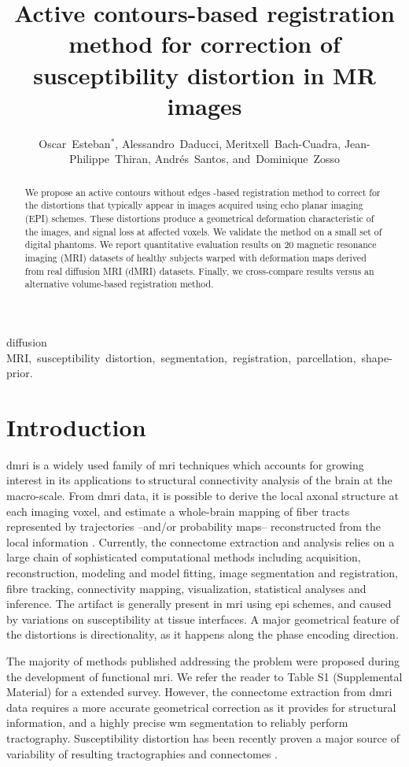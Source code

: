 \documentclass{llncs}
\title{Active contours-based registration method for correction of susceptibility distortion in MR images}
\author{Oscar~Esteban$^{*}$,
        Alessandro~Daducci,
        Meritxell~Bach-Cuadra,
        Jean-Philippe~Thiran,
        Andr\'es~Santos,
        and~Dominique~Zosso%
}
\begin{document}
\maketitle

\begin{abstract}
We propose an active contours without edges \mbox{-based} registration method
  to correct for the distortions that typically appear in
  images acquired using echo planar imaging (EPI) schemes.
These distortions produce a geometrical deformation characteristic of the images,
  and signal loss at affected voxels.
We validate the method on a small set of digital phantoms.
We report quantitative evaluation results on 20 magnetic resonance imaging (MRI) 
  datasets of healthy subjects warped with deformation maps derived from real 
  diffusion MRI (dMRI) datasets.
Finally, we cross-compare results versus an alternative volume-based registration
  method.
\end{abstract}

\begin{keywords}
diffusion MRI,~susceptibility~distortion,~segmentation,~registration,~parcellation,~shape-prior.
\end{keywords}

\section{Introduction}\label{sec:intro}
\Gls*{dmri} is a widely used family of \gls*{mri} techniques which
  accounts for growing interest in its applications to structural
  connectivity analysis of the brain at the macro-scale.
From \gls*{dmri} data, it is possible to derive the local axonal structure
  at each imaging voxel, and estimate a whole-brain mapping of fiber
  tracts represented by trajectories --and/or probability maps-- reconstructed
  from the local information \cite{craddock_imaging_2013}.
Currently, the connectome extraction and analysis relies on a large
  chain of sophisticated computational methods including acquisition,
  reconstruction, modeling and model fitting, image segmentation 
  and registration, fibre tracking, connectivity mapping, visualization,
  statistical analyses and inference.
The artifact is generally present in \gls*{mri} using \gls*{epi} schemes,
  and caused by variations on susceptibility at tissue interfaces.
A major geometrical feature of the distortions is directionality, as it 
  happens along the phase encoding direction.
  
The majority of methods published addressing the problem were
  proposed during the development of  functional \gls*{mri}. 
We refer the reader to Table S1 (Supplemental Material) for a
  extended survey.
However, the connectome extraction from \gls*{dmri} data requires
  a more accurate geometrical correction as it provides for
  structural information, and a highly precise \gls*{wm} segmentation
  to reliably perform tractography.
Susceptibility distortion has been recently proven a major source of
  variability of resulting tractographies and connectomes
  \cite{irfanoglu_effects_2012}.
  
\end{document}
